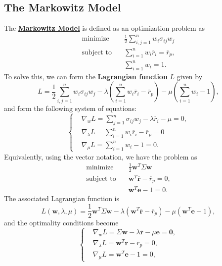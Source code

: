 \documentclass[twocolumn,landscape,10pt]{article}
\theoremstyle{definition}
\begin{document}
\subsection{The Markowitz Model}

The \textbf{\underline{Markowitz Model}} is defined as an optimization problem as
\begin{align*}
    \text{minimize}\quad & \frac{1}{2}\sum_{i,j=1}^{n}w_i\sigma_{ij}w_j \\
    \text{subject to}\quad & \sum_{i=1}^{n}w_i
    \overline{r}_i=\overline{r}_p, \\
                      & \sum_{i=1}^{n}w_i=1.
\end{align*}
To solve this, we can form the \textbf{\underline{Lagrangian function}} $L$
given by
\[
    L=\frac{1}{2}\sum_{i,j=1}^{n}w_i\sigma_{ij}w_j
    -\lambda\left(\sum_{i=1}^{n}w_i \overline{r}_i-\overline{r}_p\right)
    -\mu\left(\sum_{i=1}^{n}w_i-1\right),
\]
and form the following system of equations:
\[
    \left\{
    \begin{align*}
        &\nabla_wL=\sum_{j=1}^{n}\sigma_{ij}w_j-\lambda \overline{r}_i-\mu=0, \\
        &\nabla_\lambda L=\sum_{i=1}^{n}w_i \overline{r}_i-\overline{r}_p=0 \\
        &\nabla_\mu L=\sum_{i=1}^{n}w_i-1=0.
    \end{align*}
    \right.
\]
Equivalently, using the vector notation, we have the problem as
\begin{align*}
    \text{minimize}\quad & \frac{1}{2}\mathbf{w}^T\Sigma\mathbf{w} \\
    \text{subject to}\quad & \mathbf{w}^T\overline{\mathbf{r}}-\overline{r}_p=0, \\
                      & \mathbf{w}^T\mathbf{e}-1=0.
\end{align*}
The associated Lagrangian function is
\[
    L(\mathbf{w},\lambda,\mu)=\frac{1}{2}\mathbf{w}^T\Sigma\mathbf{w}
    -\lambda(\mathbf{w}^T\overline{\mathbf{r}}-\overline{r}_p)
    -\mu(\mathbf{w}^T\mathbf{e}-1),
\]
and the optimality conditions become
\[
    \left\{
    \begin{align*}
        &\nabla_wL=\Sigma\mathbf{w}-\lambda
        \overline{\mathbf{r}}-\mu\mathbf{e}=\mathbf{0}, \\
        &\nabla_\lambda L=\mathbf{w}^T\overline{\mathbf{r}}-\overline{r}_p=0, \\
        &\nabla_\mu L=\mathbf{w}^T\mathbf{e}-1=0,
    \end{align*}
    \right.
\]
\end{document}
